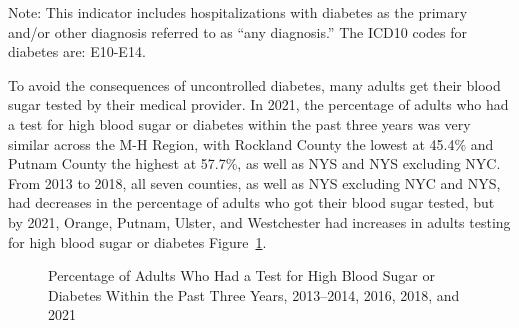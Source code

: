 \documentclass[
  english,
  letterpaper,
]{report}
\begin{document}
\begin{tcolorbox}[enhanced jigsaw, breakable, leftrule=.75mm, title=\textcolor{quarto-callout-note-color}{\faInfo}\hspace{0.5em}{Note}, bottomrule=.15mm, opacityback=0, left=2mm, colback=white, bottomtitle=1mm, coltitle=black, colbacktitle=quarto-callout-note-color!10!white, colframe=quarto-callout-note-color-frame, opacitybacktitle=0.6, toptitle=1mm, titlerule=0mm, arc=.35mm, rightrule=.15mm, toprule=.15mm]

Note: This indicator includes hospitalizations with diabetes as the
primary and/or other diagnosis referred to as ``any diagnosis.'' The
ICD10 codes for diabetes are: E10-E14.

\end{tcolorbox}

To avoid the consequences of uncontrolled diabetes, many adults get
their blood sugar tested by their medical provider. In 2021, the
percentage of adults who had a test for high blood sugar or diabetes
within the past three years was very similar across the M-H Region, with
Rockland County the lowest at 45.4\% and Putnam County the highest at
57.7\%, as well as NYS and NYS excluding NYC. From 2013 to 2018, all
seven counties, as well as NYS excluding NYC and NYS, had decreases in
the percentage of adults who got their blood sugar tested, but by 2021,
Orange, Putnam, Ulster, and Westchester had increases in adults testing
for high blood sugar or diabetes Figure~\ref{fig-highbs-dm-percent}.

\begin{figure}


\caption{\label{fig-highbs-dm-percent}Percentage of Adults Who Had a
Test for High Blood Sugar or Diabetes Within the Past Three Years,
2013--2014, 2016, 2018, and 2021}

\end{figure}%
\end{document}
